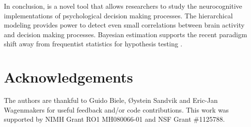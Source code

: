 \documentclass[letterpaper,10pt,english]{article}
\begin{document}
In conclusion,  is a novel tool that allows researchers to
study the neurocognitive implementations of psychological decision
making processes. The hierarchical modeling provides power to detect
even small correlations between brain activity and decision making
processes. Bayesian estimation supports the recent paradigm shift away
from frequentist statistics for hypothesis testing
\citep{Lindley65,Kruschke10,LeeWagenmakers13}.

\section*{Acknowledgements}
The authors are thankful to Guido Biele, Øystein Sandvik and Eric-Jan Wagenmakers for useful feedback and/or code contributions. This work was supported by NIMH Grant RO1 MH080066-01 and NSF Grant \#1125788.




\renewcommand{\indexname}{Index}
\printindex
\end{document}
